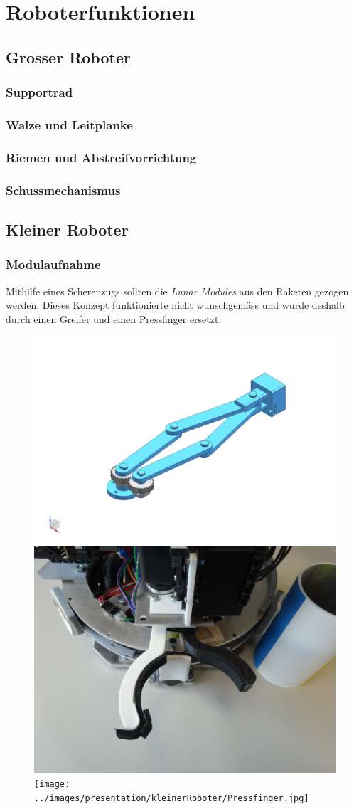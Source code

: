 \section{Roboterfunktionen}
\subsection{Grosser Roboter}

\begin{frame}
	\frametitle{Supportrad}
	
\end{frame}

\begin{frame}
	\frametitle{Walze und Leitplanke}
	
\end{frame}

\begin{frame}
	\frametitle{Riemen und Abstreifvorrichtung}
	
\end{frame}

\begin{frame}
	\frametitle{Schussmechanismus}
	
\end{frame}

\subsection{Kleiner Roboter}

\begin{frame}
	\frametitle{Modulaufnahme}
	Mithilfe eines Scherenzugs sollten die \textit{Lunar Modules} aus den Raketen gezogen werden.
	Dieses Konzept funktionierte nicht wunschgemäss und wurde deshalb durch einen Greifer und einen Pressfinger ersetzt.\\
	
	\begin{figure}
		\includegraphics[height = 3 cm]{../images/presentation/kleinerRoboter/Schere.png}
		\hspace{1em}
		\includegraphics[height = 3 cm]{../images/presentation/kleinerRoboter/Greifer.jpg}
		\hspace{2em}
		\texttt{[image: ../images/presentation/kleinerRoboter/Pressfinger.jpg]}
	\end{figure}
\end{frame}

